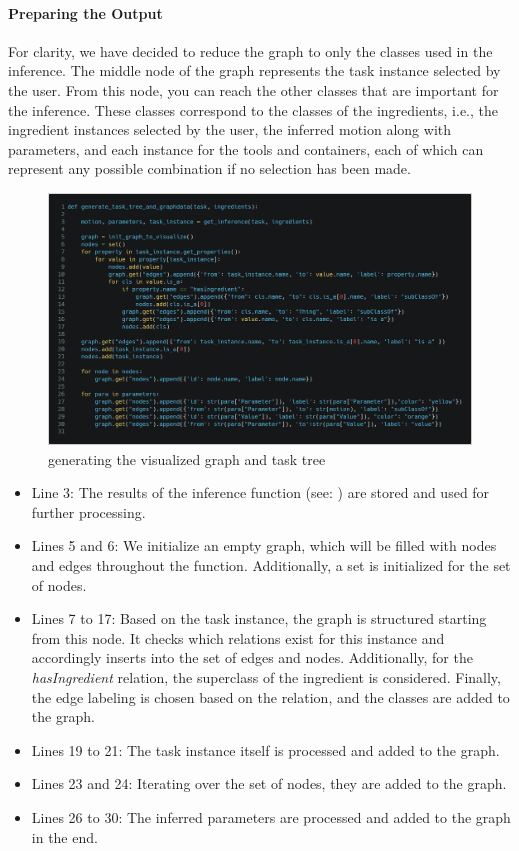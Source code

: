 \paragraph{Preparing the Output}
For clarity, we have decided to reduce the graph to only the classes used in the inference. The middle node of the graph represents the task instance selected by the user. 
From this node, you can reach the other classes that are important for the inference. 
These classes correspond to the classes of the ingredients, i.e., the ingredient instances selected by the user, the inferred motion along with parameters, 
and each instance for the tools and containers, each of which can represent any possible combination if no selection has been made.
\begin{figure}[H]
    \includegraphics[scale=0.2]{Graphics/get_graph_data_new.png}
    \caption{generating the visualized graph and task tree}
\end{figure}

\begin{itemize}
    \item Line 3: The results of the inference function (see: ) are stored and used for further processing.
    \item Lines 5 and 6: We initialize an empty graph, which will be filled with nodes and edges throughout the function. Additionally, a set is initialized for the set of nodes.
    \item Lines 7 to 17: Based on the task instance, the graph is structured starting from this node. It checks which relations exist for this instance and accordingly inserts into the set of edges and nodes. Additionally, for the \textit{hasIngredient} relation, the superclass of the ingredient is considered. Finally, the edge labeling is chosen based on the relation, and the classes are added to the graph.
    \item Lines 19 to 21: The task instance itself is processed and added to the graph.
    \item Lines 23 and 24: Iterating over the set of nodes, they are added to the graph.
    \item Lines 26 to 30: The inferred parameters are processed and added to the graph in the end.
\end{itemize}

